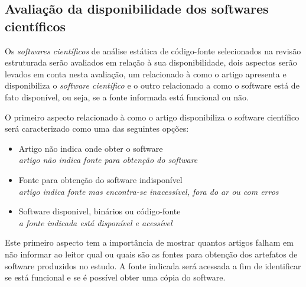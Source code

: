 \subsection{Avaliação da disponibilidade dos softwares científicos}

Os {\it softwares científicos} de análise estática de código-fonte selecionados
na revisão estruturada serão avaliados em relação à sua disponibilidade,
dois aspectos serão levados em conta nesta avaliação, um relacionado à como o
artigo apresenta e disponibiliza o {\it software científico} e
o outro relacionado a como o software está de fato disponível, ou seja, se a fonte
informada está funcional ou não.

O primeiro aspecto relacionado à como o artigo disponibiliza o software
científico será caracterizado como uma das seguintes opções:



\begin{itemize}
  \item Artigo não indica onde obter o software\\
    {\it \small artigo não indica fonte para obtenção do software}
  \item Fonte para obtenção do software indisponível\\
    {\it \small artigo indica fonte mas encontra-se inacessível, fora do ar ou com erros}
  \item Software disponivel, binários ou código-fonte\\
    {\it \small a fonte indicada está disponível e acessível}
\end{itemize}

Este primeiro aspecto tem a importância de mostrar quantos artigos falham em
não informar ao leitor qual ou quais são as fontes para obtenção dos artefatos
de software produzidos no estudo. A fonte indicada será acessada a fim de
identificar se está funcional e se é possível obter uma cópia do software.

%

